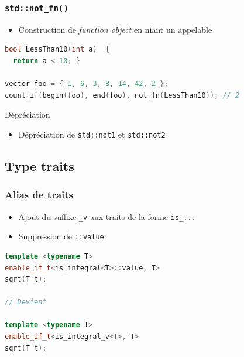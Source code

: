 \documentclass[C++.tex]{subfiles}
\begin{document}
\begin{frame}[fragile]
	\frametitle{\lstinline|std::not_fn()|}
	\begin{itemize}
		\item Construction de \textit{function object} en niant un appelable
	\end{itemize}

	\begin{lstlisting}[language=C++]
bool LessThan10(int a) 	{
  return a < 10; }
	
vector foo = { 1, 6, 3, 8, 14, 42, 2 };
count_if(begin(foo), end(foo), not_fn(LessThan10)); // 2\end{lstlisting}

	\begin{block}{Dépréciation}
		\begin{itemize}
			\item Dépréciation de \lstinline|std::not1| et \lstinline|std::not2|
		\end{itemize}
	\end{block}
\end{frame}

\subsection*{Type traits}
\begin{frame}[fragile]
	\frametitle{Alias de traits}
	\begin{itemize}
		\item Ajout du suffixe \lstinline|_v| aux traits de la forme \lstinline|is_...|
		\item Suppression de \lstinline|::value|
	\end{itemize}

	\begin{lstlisting}[language=C++]
template <typename T>
enable_if_t<is_integral<T>::value, T>
sqrt(T t);

// Devient 

template <typename T>
enable_if_t<is_integral_v<T>, T>
sqrt(T t);\end{lstlisting}
\end{frame}
\end{document}
